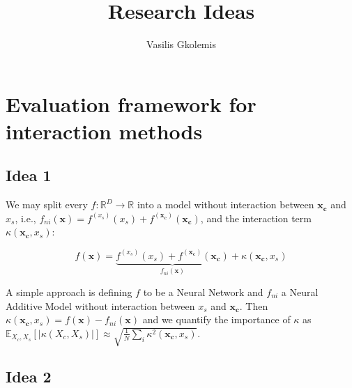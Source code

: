 \documentclass[12pt]{article}
\title{Research Ideas}
\author{Vasilis Gkolemis}
\newcommand{\xb}{\mathbf{x}}
\newcommand{\xc}{\mathbf{x_c}}
\newcommand{\fxc}{f^{(\xc)}}
\newcommand{\fxs}{f^{(x_s)}}
\begin{document}
    \maketitle
    \section{Evaluation framework for interaction methods}

    \subsection{Idea 1}

    We may split every $f: \mathbb{R}^D \rightarrow \mathbb{R}$ into
    a model without interaction between $\xc$ and $x_s$,
    i.e., $f_{ni}(\xb) = \fxs(x_s) +  \fxc(\xc)$,
    and the interaction term $\kappa(\xc, x_s)$:

    \[
      f(\xb) = \underbrace{\fxs(x_s) +  \fxc(\xc)}_{f_{ni}(\xb)} + \kappa(\xc, x_s)
    \]

    A simple approach is defining \(f\) to be a Neural Network and \(f_{ni}\) a Neural Additive Model without interaction
    between \(x_s\) and \(\xc\). Then \(\kappa(\xc, x_s) = f(\xb) - f_{ni}(\xb)\) and we quantify the importance of \(\kappa\) as \(\mathbb{E}_{X_c, X_s} \left [ |\kappa(X_c, X_s)| \right ] \approx \sqrt{\frac{1}{N} \sum_i \kappa^2(\xc, x_s)} \).

    \subsection{Idea 2}
\end{document}
